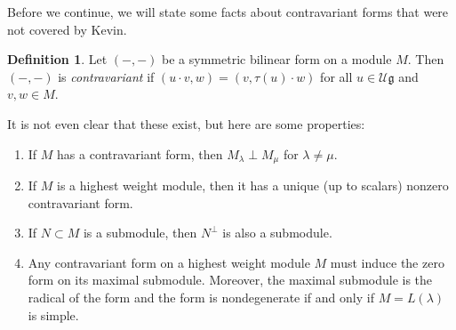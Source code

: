 \documentclass{amsart}
\theoremstyle{definition}
\newtheorem{defn}[thm]{Definition}
\theoremstyle{remark}
\theoremstyle{plain}
\theoremstyle{definition}
\theoremstyle{remark}
\newcommand{\U}{\mathcal{U}}
\newcommand{\g}{\mathfrak{g}}
\newcommand{\1}{\mathbf{1}}
\newcommand{\2}{\mathbf{2}}
\newcommand{\3}{\mathbf{3}}
\begin{document}
Before we continue, we will state some facts about contravariant forms that were not covered by Kevin.

\begin{defn}
  Let $(-,-)$ be a symmetric bilinear form on a module $M$. Then $(-,-)$ is \textit{contravariant} if $(u \cdot v, w) = (v, \tau(u) \cdot w)$ for all $u \in \U \g$ and $v, w \in M$.
\end{defn}
It is not even clear that these exist, but here are some properties:
\begin{enumerate}
  \item If $M$ has a contravariant form, then $M_{\lambda} \perp M_{\mu}$ for $\lambda \neq \mu$.
  \item If $M$ is a highest weight module, then it has a unique (up to scalars) nonzero contravariant form.
  \item If $N \subset M$ is a submodule, then $N^{\perp}$ is also a submodule.
  \item Any contravariant form on a highest weight module $M$ must induce the zero form on its maximal submodule. Moreover, the maximal submodule is the radical of the form and the form is nondegenerate if and only if $M = L(\lambda)$ is simple.
\end{enumerate}
\end{document}
